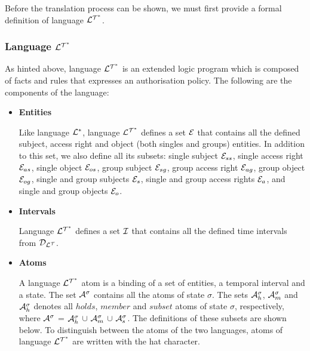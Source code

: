 \documentclass[11pt]{report}
\begin{document}
        Before the translation process can be shown, we must first provide
        a formal definition of language ${\cal L^{T^*}}$.

        \subsubsection{Language ${\cal L^{T^*}}$}

          As hinted above, language ${\cal L^{T^*}}$ is an extended logic
          program which is composed of facts and rules that expresses an
          authorisation policy. The following are the components of the
          language:

          \begin{itemize}
            \item
              {\bf Entities}

              Like language ${\cal L^*}$, language ${\cal L^{T^*}}$ defines
              a set ${\cal E}$ that contains all the defined subject, access
              right and object (both singles and groups) entities. In addition
              to this set, we also define all its subsets: single subject
              ${\cal E}_{ss}$, single access right ${\cal E}_{as}$, single
              object ${\cal E}_{os}$, group subject ${\cal E}_{sg}$, group
              access right ${\cal E}_{ag}$, group object ${\cal E}_{og}$,
              single and group subjects ${\cal E}_{s}$, single and group access
              rights ${\cal E}_{a}$, and single and group objects
              ${\cal E}_{o}$.

            \item
              {\bf Intervals}

              Language ${\cal L^{T^*}}$ defines a set ${\cal I}$ that contains
              all the defined time intervals from ${\cal D_{L^T}}$.

            \item
              {\bf Atoms}

              A language ${\cal L^{T^*}}$ atom is a binding of a set of
              entities, a temporal interval and a state. The set
              ${\cal A}^\sigma$ contains all the atoms of state $\sigma$.
              The sets ${\cal A}^{\sigma}_{h}$, ${\cal A}^{\sigma}_{m}$ and
              ${\cal A}^{\sigma}_{h}$ denotes all $holds$, $member$ and
              $subset$ atoms of state $\sigma$, respectively, where
              ${\cal A}^\sigma$ = ${\cal A}^{\sigma}_{h}$ $\cup$
              ${\cal A}^{\sigma}_{m}$ $\cup$ ${\cal A}^{\sigma}_{s}$. The
              definitions of these subsets are shown below. To distinguish
              between the atoms of the two languages, atoms of language
              ${\cal L^{T^*}}$ are written with the hat character.


\end{itemize}
\end{document}

